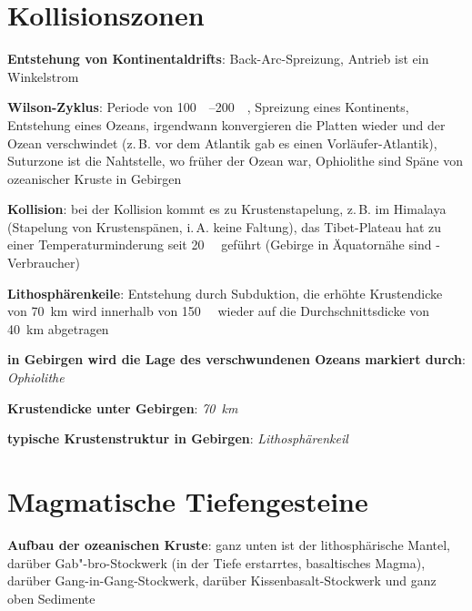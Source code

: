 \pagebreak

\section{%
    Kollisionszonen%
}

\textbf{Entstehung von Kontinentaldrifts}:
Back-Arc-Spreizung,
Antrieb ist ein Winkelstrom

\textbf{Wilson-Zyklus}:
Periode von \SIrange{100}{200}{\mega\year},
Spreizung eines Kontinents,
Entstehung eines Ozeans,
irgendwann konvergieren die Platten wieder und der Ozean verschwindet
(z.\,B. vor dem Atlantik gab es einen Vorläufer-Atlantik),
Suturzone ist die Nahtstelle, wo früher der Ozean war,
Ophiolithe sind Späne von ozeanischer Kruste in Gebirgen

\textbf{Kollision}:
bei der Kollision kommt es zu Krustenstapelung, z.\,B. im Himalaya
(Stapelung von Krustenspänen, i.\,A. keine Faltung),
das Tibet-Plateau hat zu einer Temperaturminderung seit \SI{20}{\mega\year} geführt
(Gebirge in Äquatornähe sind -Verbraucher)

\textbf{Lithosphärenkeile}:
Entstehung durch Subduktion,
die erhöhte Krustendicke von \SI{70}{\kilo\meter} wird innerhalb von
\SI{150}{\mega\year} wieder auf die Durchschnittsdicke von \SI{40}{\kilo\meter} abgetragen

\begin{wichtig}
    \item
    \textbf{in Gebirgen wird die Lage des verschwundenen Ozeans markiert durch}:\\
    \emph{Ophiolithe}

    \item
    \textbf{Krustendicke unter Gebirgen}:
    \emph{\SI[math-rm=\mathit,text-rm=\itshape]{70}{\kilo\meter}}

    \item
    \textbf{typische Krustenstruktur in Gebirgen}:
    \emph{Lithosphärenkeil}
\end{wichtig}

\section{%
    Magmatische Tiefengesteine%
}

\textbf{Aufbau der ozeanischen Kruste}:
ganz unten ist der lithosphärische Mantel,
darüber Gab"-bro-Stockwerk (in der Tiefe erstarrtes, basaltisches Magma),
darüber Gang-in-Gang-Stockwerk,
darüber Kissenbasalt-Stockwerk und
ganz oben Sedimente

